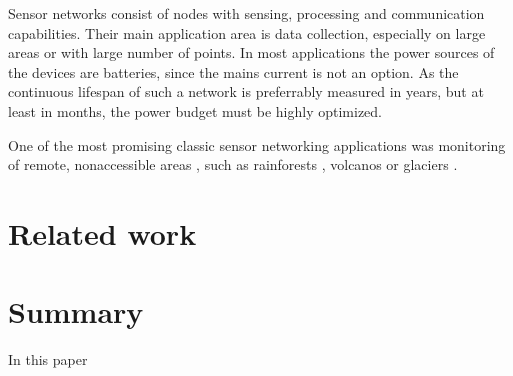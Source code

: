 \documentclass[conference]{IEEEtran}
\begin{document}
Sensor networks consist of nodes with sensing, processing and communication
capabilities. Their main application area is data collection, especially
on large areas or with large number of points. In most applications
the power sources of the devices are batteries, since the mains current
is not an option. As the continuous lifespan of such a network is
preferrably measured in years, but at least in months, the power
budget must be highly optimized.

One of the most promising classic sensor networking applications was monitoring
of remote, nonaccessible areas \cite{corke2010}, such as rainforests
\cite{wark2008, cama2013}, volcanos \cite{werner2006, song2009} or glaciers \cite{martinez2004, martinez2005}. 

\section{Related work}



\section{Summary}

In this paper 



\end{document}
